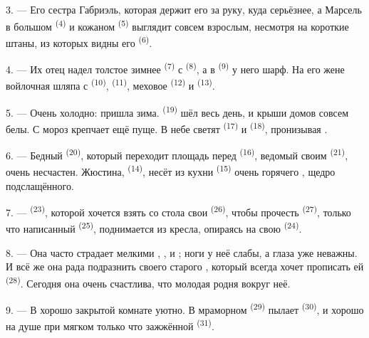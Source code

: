 3. --- Его сестра Габриэль, которая держит его за руку, куда серьёзнее, а
Марсель в большом  \textsuperscript{(4)} и кожаном 
\textsuperscript{(5)} выглядит совсем взрослым, несмотря на короткие штаны, из
которых видны его  \textsuperscript{(6)}.

4. --- Их отец надел толстое зимнее  \textsuperscript{(7)} с
 \textsuperscript{(8)}, а в 
\textsuperscript{(9)} у него шарф. На его жене войлочная шляпа с 
\textsuperscript{(10)},  \textsuperscript{(11)}, меховое 
\textsuperscript{(12)} и  \textsuperscript{(13)}.

5. --- Очень холодно: пришла зима.  \textsuperscript{(19)} шёл
весь день, и крыши домов совсем белы. С  мороз крепчает ещё
пуще. В небе светят  \textsuperscript{(17)} и 
\textsuperscript{(18)}, пронизывая .

\VUsaut{4.2mm}
\VUsaut{3.0mm}

6. --- Бедный  \textsuperscript{(20)}, который переходит площадь
перед  \textsuperscript{(16)}, ведомый своим 
\textsuperscript{(21)}, очень несчастен. Жюстина, 
\textsuperscript{(14)}, несёт из кухни  \textsuperscript{(15)} очень
горячего , щедро подслащённого.

7. ---  \textsuperscript{(23)}, которой хочется взять со стола
свои  \textsuperscript{(26)}, чтобы прочесть 
\textsuperscript{(27)}, только что написанный  \textsuperscript{(25)},
поднимается из кресла, опираясь на свою  \textsuperscript{(24)}.

8. --- Она часто страдает мелкими , ,
 и ; ноги у неё слабы, а глаза уже
неважны. И всё же она рада подразнить своего старого ,
который всегда хочет прописать ей  \textsuperscript{(28)}.
Сегодня она очень счастлива, что молодая родня вокруг неё.

9. --- В хорошо закрытой комнате уютно. В мраморном 
\textsuperscript{(29)} пылает  \textsuperscript{(30)}, и хорошо
на душе при мягком  только что зажжённой 
\textsuperscript{(31)}.


